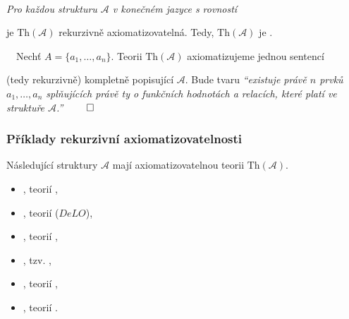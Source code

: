     \medskip
    
    \smallskip
    
    {\bf {}}\ \ {\it Pro každou  strukturu $\mathcal{A}$ v konečném jazyce s rovností
    \smallskip
    
    je $\mathrm{Th}(\mathcal{A})$ rekurzivně axiomatizovatelná. Tedy, $\mathrm{Th}(\mathcal{A})$ je .}
    \medskip
    
    \smallskip
    
    {\it {}}\ \ Nechť $A=\{a_1,\dots,a_n\}$. Teorii $\mathrm{Th}(\mathcal{A})$ axiomatizujeme jednou sentencí
    \smallskip
    
    (tedy rekurzivně) kompletně popisující $\mathcal{A}$. Bude tvaru \emph{``existuje právě $n$ prvků   
    $a_1,\dots,a_n$ splňujících právě ty  o funkčních hodnotách a relacích, které platí ve struktuře $\mathcal{A}$.''} $\qed$
    
    
    \subsubsection*{Příklady rekurzivní axiomatizovatelnosti}
    Následující struktury $\mathcal{A}$ mají  axiomatizovatelnou teorii $\mathrm{Th}(\mathcal{A})$.
    \medskip
    
    \begin{itemize}
    \item {}, teorií ,
    \smallskip
    
    \item {}, teorií  ($DeLO$),
    \smallskip
    
    \item {}, teorií ,
    \smallskip
    
    \item {}, tzv. ,
    \smallskip
    
    \item {}, teorií ,
    \smallskip
    
    \item {}, teorií .
    \end{itemize}
    \medskip
    
